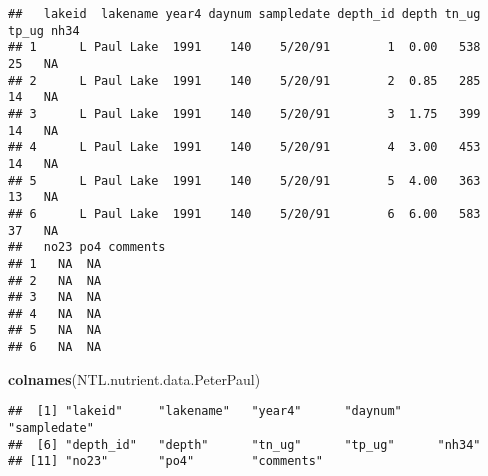 \documentclass[]{article}
\newenvironment{Shaded}{\begin{snugshade}}{\end{snugshade}}
\newcommand{\KeywordTok}[1]{\textcolor[rgb]{0.13,0.29,0.53}{\textbf{#1}}}
\newcommand{\DataTypeTok}[1]{\textcolor[rgb]{0.13,0.29,0.53}{#1}}
\newcommand{\StringTok}[1]{\textcolor[rgb]{0.31,0.60,0.02}{#1}}
\newcommand{\CommentTok}[1]{\textcolor[rgb]{0.56,0.35,0.01}{\textit{#1}}}
\newcommand{\OperatorTok}[1]{\textcolor[rgb]{0.81,0.36,0.00}{\textbf{#1}}}
\newcommand{\NormalTok}[1]{#1}
\begin{document}
\begin{Shaded}
\end{Shaded}

\begin{verbatim}
##   lakeid  lakename year4 daynum sampledate depth_id depth tn_ug tp_ug nh34
## 1      L Paul Lake  1991    140    5/20/91        1  0.00   538    25   NA
## 2      L Paul Lake  1991    140    5/20/91        2  0.85   285    14   NA
## 3      L Paul Lake  1991    140    5/20/91        3  1.75   399    14   NA
## 4      L Paul Lake  1991    140    5/20/91        4  3.00   453    14   NA
## 5      L Paul Lake  1991    140    5/20/91        5  4.00   363    13   NA
## 6      L Paul Lake  1991    140    5/20/91        6  6.00   583    37   NA
##   no23 po4 comments
## 1   NA  NA         
## 2   NA  NA         
## 3   NA  NA         
## 4   NA  NA         
## 5   NA  NA         
## 6   NA  NA
\end{verbatim}

\begin{Shaded}
\begin{Highlighting}[]
\KeywordTok{colnames}\NormalTok{(NTL.nutrient.data.PeterPaul)}
\end{Highlighting}
\end{Shaded}

\begin{verbatim}
##  [1] "lakeid"     "lakename"   "year4"      "daynum"     "sampledate"
##  [6] "depth_id"   "depth"      "tn_ug"      "tp_ug"      "nh34"      
## [11] "no23"       "po4"        "comments"
\end{verbatim}
\end{document}
